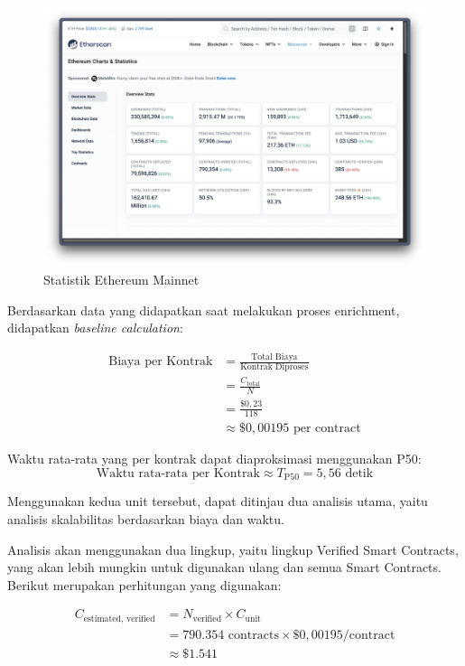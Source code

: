 \begin{figure}[ht]
	\centering
	\includegraphics[width=1\textwidth]{resources/chapter-4/smart-contracts.png}
	\caption{Statistik Ethereum Mainnet}
	\label{image:etherscan-smart-contracts}
\end{figure}

Berdasarkan data yang didapatkan saat melakukan proses enrichment, didapatkan \textit{baseline calculation}:

\begin{align*}
	\text{Biaya per Kontrak} & = \frac{\text{Total Biaya}}{\text{Kontrak Diproses}} \\
	                         & = \frac{C_{\text{total}}}{N}                         \\
	                         & = \frac{\$0,23}{118}                                 \\
	                         & \approx \$0,00195 \text{ per contract}
\end{align*}

Waktu rata-rata yang per kontrak dapat diaproksimasi menggunakan P50:
\[
	\text{Waktu rata-rata per Kontrak} \approx T_{\text{P50}} = 5,56 \text{ detik}
\]

Menggunakan kedua unit tersebut, dapat ditinjau dua analisis utama, yaitu analisis skalabilitas berdasarkan biaya dan waktu.


Analisis akan menggunakan dua lingkup, yaitu lingkup Verified Smart Contracts, yang akan lebih mungkin untuk digunakan ulang dan semua Smart Contracts. Berikut merupakan perhitungan yang digunakan:

\begin{align*}
	C_{\text{estimated, verified}} & = N_{\text{verified}} \times C_{\text{unit}}                 \\
	                               & = 790.354 \text{ contracts} \times \$0,00195/\text{contract} \\
	                               & \approx \$1.541
\end{align*}

